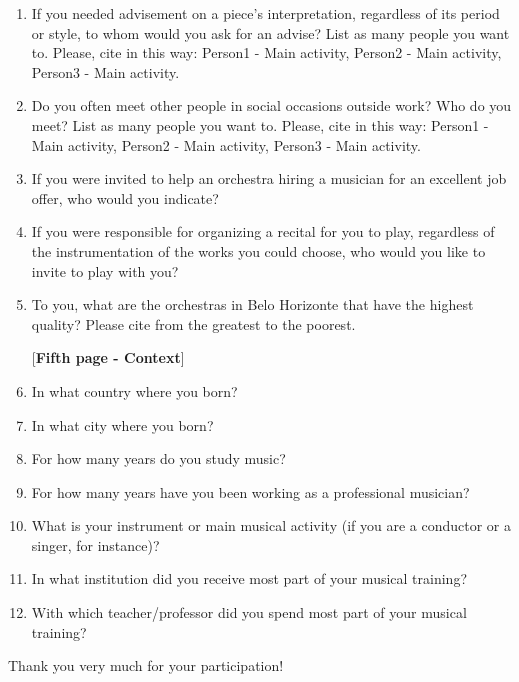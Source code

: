 \documentclass[a4paper, 12pt, openright, oneside, german, french, brazil, english]{abntex2}
\begin{document}
\begin{enumerate}
          
        
        \item If you needed advisement on a piece's interpretation, regardless of its period or style, to whom would you ask for an advise? List as many people you want to. Please, cite in this way: Person1 - Main activity, Person2 - Main activity, Person3 - Main activity.
        
        \item Do you often meet other people in social occasions outside work? Who do you meet? List as many people you want to. Please, cite in this way: Person1 - Main activity, Person2 - Main activity, Person3 - Main activity.

        \item If you were invited to help an orchestra hiring a musician for an excellent job offer, who would you indicate?

        \item If you were responsible for organizing a recital for you to play, regardless of the instrumentation of the works you could choose, who would you like to invite to play with you?

        \item To you, what are the orchestras in Belo Horizonte that have the highest quality? Please cite from the greatest to the poorest.


        

        [\textbf{Fifth page - Context}]
        
        \item In what country where you born?
        \item In what city where you born?
        \item For how many years do you study music?
        \item For how many years have you been working as a professional musician?
        \item What is your instrument or main musical activity (if you are a conductor or a singer, for instance)?
        \item In what institution did you receive most part of your musical training?
        \item With which teacher/professor did you spend most part of your musical training? 


        \end{enumerate}

        Thank you very much for your participation!
\end{document}
